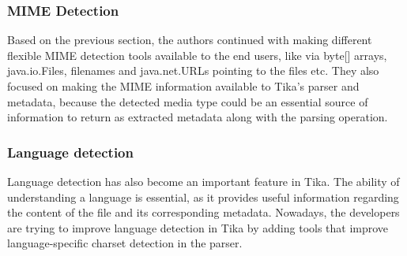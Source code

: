 \documentclass{article}
\begin{document}
\subsubsection{MIME Detection}
Based on the previous section, the authors continued with making different flexible MIME detection tools available to the end users, like via byte[] arrays, java.io.Files, filenames and java.net.URLs pointing to the files etc. They  also focused on making the MIME information available to Tika’s parser and metadata, because the detected media type could be an essential source of information to return as extracted metadata along with the parsing operation.

\subsubsection{Language detection}
Language detection has also become an important feature in Tika. The ability of understanding a language is essential, as it provides useful information regarding the content of the file and its corresponding metadata. Nowadays, the developers are trying to improve language detection in Tika by adding tools that improve language-specific charset detection in the parser.
\end{document}

